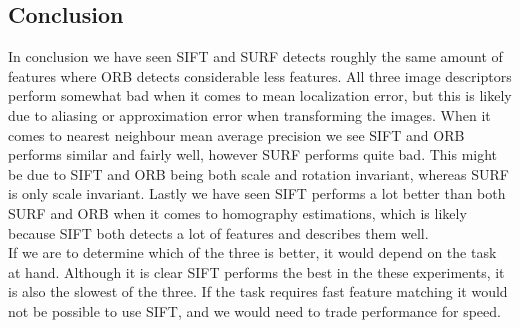 \subsection{Conclusion}
In conclusion we have seen SIFT and SURF detects roughly the same amount of features where ORB detects considerable less features. All three image descriptors perform somewhat bad when it comes to mean localization error, but this is likely due to aliasing or approximation error when transforming the images. When it comes to nearest neighbour mean average precision we see SIFT and ORB performs similar and fairly well, however SURF performs quite bad. This might be due to SIFT and ORB being both scale and rotation invariant, whereas SURF is only scale invariant. Lastly we have seen SIFT performs a lot better than both SURF and ORB when it comes to homography estimations, which is likely because SIFT both detects a lot of features and describes them well.\\
If we are to determine which of the three is better, it would depend on the task at hand. Although it is clear SIFT performs the best in the these experiments, it is also the slowest of the three. If the task requires fast feature matching it would not be possible to use SIFT, and we would need to trade performance for speed.